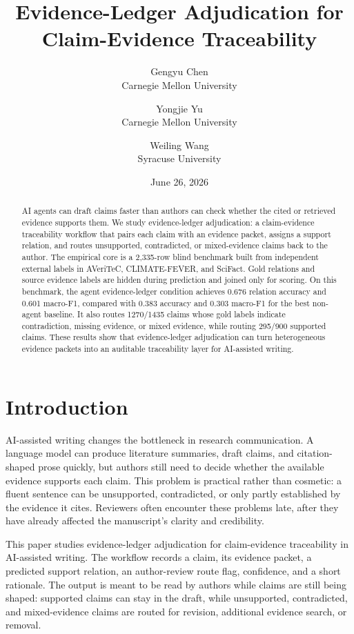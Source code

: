\documentclass[11pt]{article}
\title{Evidence-Ledger Adjudication for Claim-Evidence Traceability}
\author{
Gengyu Chen\\
Carnegie Mellon University
\and
Yongjie Yu\\
Carnegie Mellon University
\and
Weiling Wang\\
Syracuse University
}
\date{June 26, 2026}
\begin{document}
\maketitle

\begin{abstract}
AI agents can draft claims faster than authors can check whether the cited or retrieved evidence supports them. We study evidence-ledger adjudication: a claim-evidence traceability workflow that pairs each claim with an evidence packet, assigns a support relation, and routes unsupported, contradicted, or mixed-evidence claims back to the author. The empirical core is a 2,335-row blind benchmark built from independent external labels in AVeriTeC, CLIMATE-FEVER, and SciFact. Gold relations and source evidence labels are hidden during prediction and joined only for scoring. On this benchmark, the agent evidence-ledger condition achieves 0.676 relation accuracy and 0.601 macro-F1, compared with 0.383 accuracy and 0.303 macro-F1 for the best non-agent baseline. It also routes 1270/1435 claims whose gold labels indicate contradiction, missing evidence, or mixed evidence, while routing 295/900 supported claims. These results show that evidence-ledger adjudication can turn heterogeneous evidence packets into an auditable traceability layer for AI-assisted writing.
\end{abstract}

\section{Introduction}

AI-assisted writing changes the bottleneck in research communication. A language model can produce literature summaries, draft claims, and citation-shaped prose quickly, but authors still need to decide whether the available evidence supports each claim. This problem is practical rather than cosmetic: a fluent sentence can be unsupported, contradicted, or only partly established by the evidence it cites. Reviewers often encounter these problems late, after they have already affected the manuscript's clarity and credibility.

This paper studies evidence-ledger adjudication for claim-evidence traceability in AI-assisted writing. The workflow records a claim, its evidence packet, a predicted support relation, an author-review route flag, confidence, and a short rationale. The output is meant to be read by authors while claims are still being shaped: supported claims can stay in the draft, while unsupported, contradicted, and mixed-evidence claims are routed for revision, additional evidence search, or removal.
\end{document}
